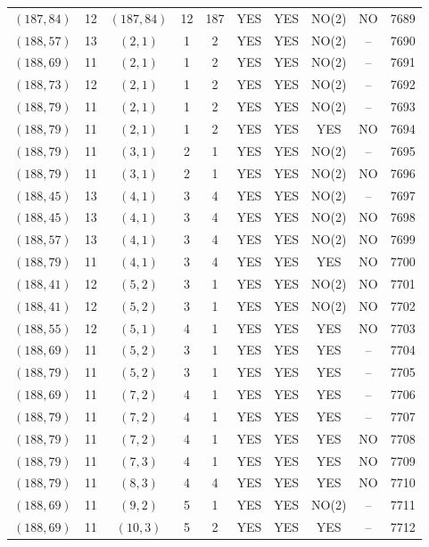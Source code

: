 \begin{longtable}{|c|c|c|c|c|c|c|c|c|c|}
$(187, 84)$ & 12 & $(187, 84)$ & 12 & 187 & YES & YES & NO(2) & NO & 7689\\
$(188, 57)$ & 13 & $(2, 1)$ & 1 & 2 & YES & YES & NO(2) & -- & 7690\\
$(188, 69)$ & 11 & $(2, 1)$ & 1 & 2 & YES & YES & NO(2) & -- & 7691\\
$(188, 73)$ & 12 & $(2, 1)$ & 1 & 2 & YES & YES & NO(2) & -- & 7692\\
$(188, 79)$ & 11 & $(2, 1)$ & 1 & 2 & YES & YES & NO(2) & -- & 7693\\
$(188, 79)$ & 11 & $(2, 1)$ & 1 & 2 & YES & YES & YES & NO & 7694\\
$(188, 79)$ & 11 & $(3, 1)$ & 2 & 1 & YES & YES & NO(2) & -- & 7695\\
$(188, 79)$ & 11 & $(3, 1)$ & 2 & 1 & YES & YES & NO(2) & NO & 7696\\
$(188, 45)$ & 13 & $(4, 1)$ & 3 & 4 & YES & YES & NO(2) & -- & 7697\\
$(188, 45)$ & 13 & $(4, 1)$ & 3 & 4 & YES & YES & NO(2) & NO & 7698\\
$(188, 57)$ & 13 & $(4, 1)$ & 3 & 4 & YES & YES & NO(2) & NO & 7699\\
$(188, 79)$ & 11 & $(4, 1)$ & 3 & 4 & YES & YES & YES & NO & 7700\\
$(188, 41)$ & 12 & $(5, 2)$ & 3 & 1 & YES & YES & NO(2) & NO & 7701\\
$(188, 41)$ & 12 & $(5, 2)$ & 3 & 1 & YES & YES & NO(2) & NO & 7702\\
$(188, 55)$ & 12 & $(5, 1)$ & 4 & 1 & YES & YES & YES & NO & 7703\\
$(188, 69)$ & 11 & $(5, 2)$ & 3 & 1 & YES & YES & YES & -- & 7704\\
$(188, 79)$ & 11 & $(5, 2)$ & 3 & 1 & YES & YES & YES & -- & 7705\\
$(188, 69)$ & 11 & $(7, 2)$ & 4 & 1 & YES & YES & YES & -- & 7706\\
$(188, 79)$ & 11 & $(7, 2)$ & 4 & 1 & YES & YES & YES & -- & 7707\\
$(188, 79)$ & 11 & $(7, 2)$ & 4 & 1 & YES & YES & YES & NO & 7708\\
$(188, 79)$ & 11 & $(7, 3)$ & 4 & 1 & YES & YES & YES & NO & 7709\\
$(188, 79)$ & 11 & $(8, 3)$ & 4 & 4 & YES & YES & YES & NO & 7710\\
$(188, 69)$ & 11 & $(9, 2)$ & 5 & 1 & YES & YES & NO(2) & -- & 7711\\
$(188, 69)$ & 11 & $(10, 3)$ & 5 & 2 & YES & YES & YES & -- & 7712\\

\end{longtable}
